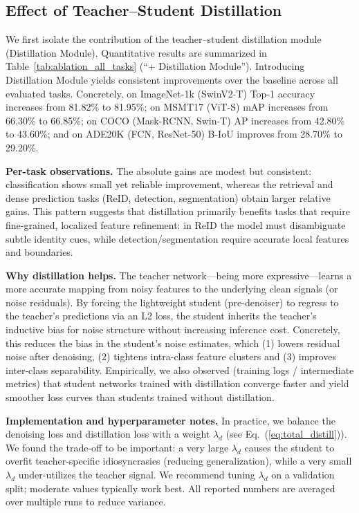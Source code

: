\documentclass[conference]{IEEEtran}
\begin{document}
{\subsection{Effect of Teacher--Student Distillation}
\label{sec:exp_distill}

We first isolate the contribution of the teacher--student distillation module (Distillation Module). Quantitative results are summarized in Table~\ref{tab:ablation_all_tasks} (``+ Distillation Module''). Introducing Distillation Module yields consistent improvements over the baseline across all evaluated tasks. Concretely, on ImageNet-1k (SwinV2-T) Top-1 accuracy increases from 81.82\% to 81.95\%; on MSMT17 (ViT-S) mAP increases from 66.30\% to 66.85\%; on COCO (Mask-RCNN, Swin-T) AP increases from 42.80\% to 43.60\%; and on ADE20K (FCN, ResNet-50) B-IoU improves from 28.70\% to 29.20\%.

\textbf{Per-task observations.} The absolute gains are modest but consistent: classification shows small yet reliable improvement, whereas the retrieval and dense prediction tasks (ReID, detection, segmentation) obtain larger relative gains. This pattern suggests that distillation primarily benefits tasks that require fine-grained, localized feature refinement: in ReID the model must disambiguate subtle identity cues, while detection/segmentation require accurate local features and boundaries.

\textbf{Why distillation helps.} The teacher network—being more expressive—learns a more accurate mapping from noisy features to the underlying clean signals (or noise residuals). By forcing the lightweight student (pre-denoiser) to regress to the teacher's predictions via an L2 loss, the student inherits the teacher's inductive bias for noise structure without increasing inference cost. Concretely, this reduces the bias in the student’s noise estimates, which (1) lowers residual noise after denoising, (2) tightens intra-class feature clusters and (3) improves inter-class separability. Empirically, we also observed (training logs / intermediate metrics) that student networks trained with distillation converge faster and yield smoother loss curves than students trained without distillation.

\textbf{Implementation and hyperparameter notes.} In practice, we balance the denoising loss and distillation loss with a weight $\lambda_d$ (see Eq.~(\ref{eq:total_distill})). We found the trade-off to be important: a very large $\lambda_d$ causes the student to overfit teacher-specific idiosyncrasies (reducing generalization), while a very small $\lambda_d$ under-utilizes the teacher signal. We recommend tuning $\lambda_d$ on a validation split; moderate values typically work best. All reported numbers are averaged over multiple runs to reduce variance.



}
\end{document}
